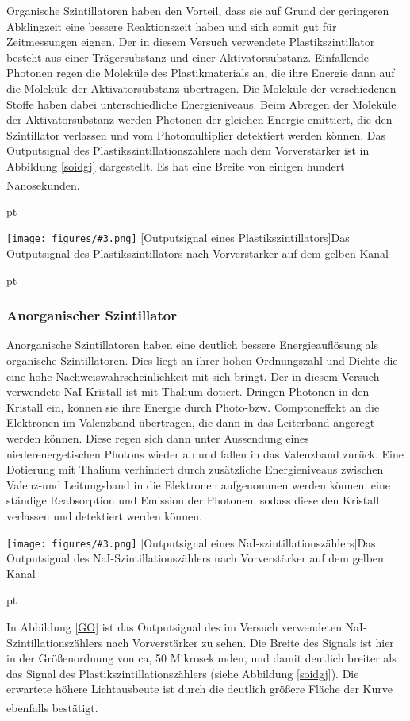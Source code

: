 \documentclass[12pt,listof=totoc]{scrartcl}
\newcommand{\graShort}[4][0.7]{
	\begin{minipage}[h!]{\textwidth}
		\centering
		\texttt{[image: figures/\#3.png]}
		\captionof{figure}[#2]{#4}
	\end{minipage}
	\vskip 30 pt
}
\begin{document}
 Organische Szintillatoren haben den Vorteil, dass sie auf Grund der geringeren Abklingzeit eine bessere Reaktionszeit haben und sich somit gut für Zeitmessungen eignen. Der in diesem Versuch verwendete Plastikszintillator besteht aus einer Trägersubstanz und einer Aktivatorsubstanz. Einfallende Photonen regen die Moleküle des Plastikmaterials an, die ihre Energie dann auf die Moleküle der Aktivatorsubstanz übertragen. Die Moleküle der verschiedenen Stoffe haben dabei unterschiedliche Energieniveaus. Beim Abregen der Moleküle der Aktivatorsubstanz werden Photonen der gleichen Energie emittiert, die den Szintillator verlassen und vom Photomultiplier detektiert werden können.
 Das Outputsignal des Plastikszintillationszählers nach dem Vorverstärker ist in Abbildung \ref{soidgj} dargestellt. Es hat eine Breite von einigen hundert Nanosekunden.\textsuperscript{\cite{staat}}
 
  pt
 \graShort{Outputsignal eines Plastikszintillators}{Plastik-Szinti}{Das Outputsignal des Plastikszintillators nach Vorverstärker auf dem gelben Kanal  \label{soidgj}}

 \subsubsection{Anorganischer Szintillator \label{ASZ}}
 
 Anorganische Szintillatoren haben eine deutlich bessere Energieauflösung als organische Szintillatoren. Dies liegt an ihrer hohen Ordnungszahl und Dichte die eine hohe Nachweiswahrscheinlichkeit mit sich bringt. Der in diesem Versuch verwendete NaI-Kristall ist mit Thalium dotiert. 
 Dringen Photonen in den Kristall ein, können sie ihre Energie durch Photo-bzw. Comptoneffekt an die Elektronen im Valenzband übertragen, die dann in das Leiterband angeregt werden können. Diese regen sich dann unter Aussendung eines niederenergetischen Photons wieder ab und fallen in das Valenzband zurück. Eine Dotierung mit Thalium verhindert durch zusätzliche Energieniveaus zwischen Valenz-und Leitungsband in die Elektronen aufgenommen werden können, eine ständige Reabsorption und Emission der Photonen, sodass diese den Kristall verlassen und detektiert werden können.
 
  \graShort{Outputsignal eines NaI-szintillationszählers}{NaI-Szinti}{Das Outputsignal des NaI-Szintillationszählers nach Vorverstärker auf dem gelben Kanal \label{GO}}
  
  In Abbildung \ref{GO} ist das Outputsignal des im Versuch verwendeten NaI-Szintillationszählers nach Vorverstärker zu sehen. Die Breite des Signals ist hier in der Größenordnung von ca, 50 Mikrosekunden, und damit deutlich breiter als das Signal des Plastikszintillationszählers (siehe Abbildung \ref{soidgj}). Die erwartete höhere Lichtausbeute ist durch die deutlich größere Fläche der Kurve ebenfalls bestätigt.\textsuperscript{\cite{staat}}
\end{document}

